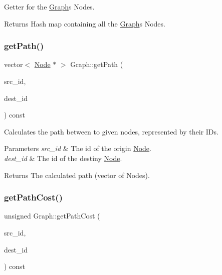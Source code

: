 Getter for the \hyperlink{class_graph}{Graph}\textquotesingle{}s Nodes.

\begin{DoxyReturn}{Returns}
Hash map containing all the \hyperlink{class_graph}{Graph}\textquotesingle{}s Nodes. 
\end{DoxyReturn}
\hypertarget{class_graph_ae4c66eaf1b29f53bf90ad6266baa6819}{}\label{class_graph_ae4c66eaf1b29f53bf90ad6266baa6819} 
\subsubsection{\texorpdfstring{get\+Path()}{getPath()}}
{\footnotesize\ttfamily vector$<$ \hyperlink{class_node}{Node} $\ast$ $>$ Graph\+::get\+Path (\begin{DoxyParamCaption}\item[{node\+\_\+id}]{src\+\_\+id,  }\item[{node\+\_\+id}]{dest\+\_\+id }\end{DoxyParamCaption}) const}

Calculates the path between to given nodes, represented by their I\+Ds.


\begin{DoxyParams}{Parameters}
{\em src\+\_\+id} & The id of the origin \hyperlink{class_node}{Node}. \\
\hline
{\em dest\+\_\+id} & The id of the destiny \hyperlink{class_node}{Node}.\\
\hline
\end{DoxyParams}
\begin{DoxyReturn}{Returns}
The calculated path (vector of Nodes). 
\end{DoxyReturn}
\hypertarget{class_graph_a9d5ab1a266d948f146e78866ef19673d}{}\label{class_graph_a9d5ab1a266d948f146e78866ef19673d} 
\subsubsection{\texorpdfstring{get\+Path\+Cost()}{getPathCost()}}
{\footnotesize\ttfamily unsigned Graph\+::get\+Path\+Cost (\begin{DoxyParamCaption}\item[{node\+\_\+id}]{src\+\_\+id,  }\item[{node\+\_\+id}]{dest\+\_\+id }\end{DoxyParamCaption}) const}

